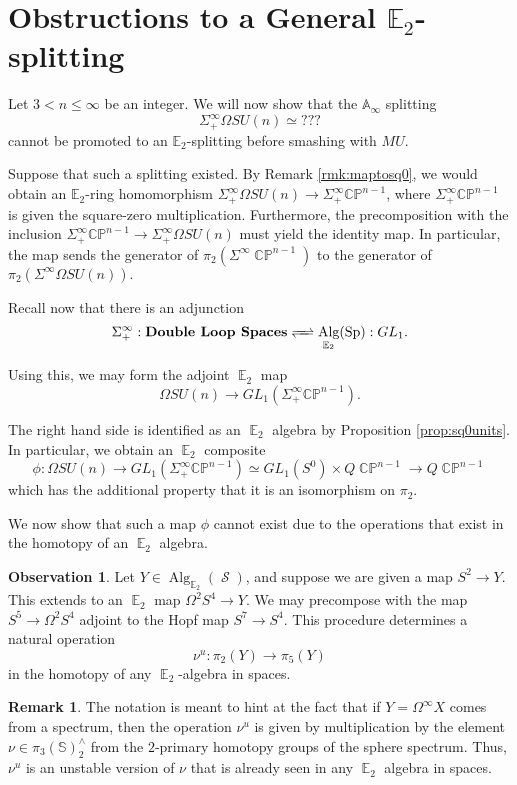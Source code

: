 \documentclass[reqno, oneside]{amsart}
\theoremstyle{definition}
\newtheorem{rmk}[nul]{Remark}
\newtheorem{obs}[nul]{Observation}
\theoremstyle{plain}
\DeclareMathOperator{\CP}{\mathbb{CP}}
\DeclareMathOperator{\E}{\mathbb{E}}
\DeclareMathOperator{\cS}{\mathcal{S}}
\DeclareMathOperator{\Alg}{\text{Alg}}
\DeclareMathOperator{\Sp}{\text{Sp}}
\begin{document}
\section{Obstructions to a General \texorpdfstring{$\mathbb{E}_2$}{E2}-splitting}

Let $3< n\leq \infty$ be an integer.  We will now show that the $\mathbb{A}_\infty$ splitting $$\Sigma^{\infty}_+ \Omega SU(n) \simeq ???$$ cannot be promoted to an $\mathbb{E}_2$-splitting before smashing with $MU$.  

Suppose that such a splitting existed.  By Remark \ref{rmk:maptosq0}, we would obtain an $\mathbb{E}_2$-ring homomorphism $\Sigma^{\infty}_+ \Omega SU(n) \rightarrow \Sigma^{\infty}_+ \mathbb{CP}^{n-1}$, where $\Sigma^{\infty}_+ \mathbb{CP}^{n-1}$ is given the square-zero multiplication.  Furthermore, the precomposition with the inclusion $\Sigma^{\infty}_+ \mathbb{CP}^{n-1} \longrightarrow \Sigma^{\infty}_+ \Omega SU(n)$ must yield the identity map.  In particular, the map sends the generator of $\pi_2(\Sigma^{\infty}\CP^{n-1})$ to the generator of $\pi_2(\Sigma^{\infty}\Omega SU(n)).$  



Recall now that there is an adjunction \cite{MQRT}
$$\Sigma^{\infty}_+:\textbf{Double Loop Spaces}  \xrightleftharpoons{\quad} \Alg_{\E_2}(\Sp) :GL_1.$$

Using this, we may form the adjoint $\E_2$ map
$$\Omega SU(n) \rightarrow GL_1(\Sigma^{\infty}_+ \mathbb{CP}^{n-1}).$$

The right hand side is identified as an $\E_2$ algebra by Proposition \ref{prop:sq0units}.  In particular, we obtain an $\E_2$ composite $$\phi: \Omega SU(n) \to GL_1(\Sigma^{\infty}_+ \mathbb{CP}^{n-1}) \simeq  GL_1(S^0) \times Q\CP^{n-1} \to Q\CP^{n-1}$$ which has the additional property that it is an isomorphism on $\pi_2$.

We now show that such a map $\phi$ cannot exist due to the operations that exist in the homotopy of an $\E_2$ algebra.  

\begin{obs}Let $Y\in \Alg_{\E_2}(\cS)$, and suppose we are given a map $S^2\to Y$.  This extends to an $\E_2$ map $\Omega^2 S^4 \to Y.$  We may precompose with the map $S^5 \to \Omega^2 S^4$ adjoint to the Hopf map $S^7\to S^4$.  This procedure determines a natural operation $$\nu^u: \pi_2(Y) \to \pi_5(Y)$$ in the homotopy of any $\E_2$-algebra in spaces.  
\end{obs}

\begin{rmk} \label{rmk:multnu}
The notation is meant to hint at the fact that if $Y = \Omega^\infty X$ comes from a spectrum, then the operation $\nu^u$ is given by multiplication by the element $\nu \in \pi_3(\mathbb{S})^{\wedge}_2$ from the $2$-primary homotopy groups of the sphere spectrum.  Thus, $\nu^u$ is an unstable version of $\nu$ that is already seen in any $\E_2$ algebra in spaces.    
\end{rmk}
\end{document}
